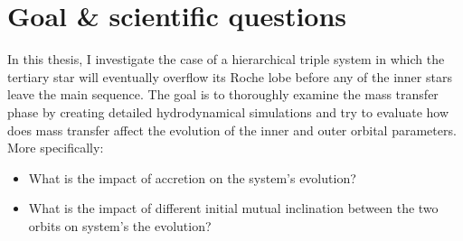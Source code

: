 \section{Goal \& scientific questions}\label{sec:goal}

In this thesis, I investigate the case of a hierarchical triple system in which the tertiary star will eventually overflow its Roche lobe before any of the inner stars leave the main sequence. The goal is to thoroughly examine the mass transfer phase by creating detailed hydrodynamical simulations and try to evaluate how does mass transfer affect the evolution of the inner and outer orbital parameters. More specifically:
\begin{itemize}
    \item What is the impact of accretion on the system's evolution?
    \item What is the impact of different initial mutual inclination between the two orbits on system's the evolution?
\end{itemize}





